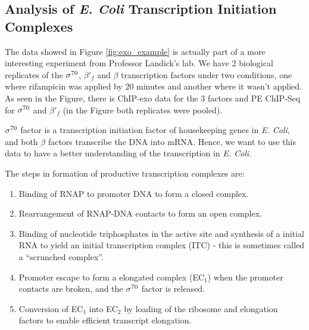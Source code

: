 \documentclass[11pt]{article}\usepackage[]{graphicx}\usepackage[]{color}
\begin{document}
\subsection{Analysis of \emph{E. Coli} Transcription Initiation Complexes}
\label{sec:ecoli}

The data showed in Figure \ref{fig:exo_example} is actually part of a
more interesting experiment from Professor Landick's lab. We have 2
biological replicates of the $\sigma^{70}$, $\beta'_f$ and $\beta$
transcription factors under two conditions, one where rifampicin was
applied by 20 minutes and another where it wasn't applied. As seen in
the Figure, there is ChIP-exo data for the 3 factors and PE ChIP-Seq
for $\sigma^{70}$ and $\beta'_f$ (in the Figure both replicates were pooled).

$\sigma^{70}$ factor is a transcription initiation factor of housekeeping
genes in \emph{E. Coli}, and both $\beta$ factors transcribe the DNA into
mRNA. Hence, we want to use this data to have a better understanding
of the transcription in \emph{E. Coli}.

The steps in formation of productive transcription complexes are:

\begin{enumerate}
\item Binding of RNAP to promoter DNA to form a closed complex.
\item Rearrangement of RNAP-DNA contacts to form an open complex.
\item Binding of nucleotide triphosphates in the active site and
  synthesis of a initial RNA to yield an initial transcription complex
  (ITC) - this is sometimes called a ``scrunched complex''.
\item Promoter escape to form a elongated complex (EC$_1$) when the
  promoter contacts are broken, and the $\sigma^{70}$ factor is released.
\item Conversion of EC$_1$ into EC$_2$ by loading of the ribosome and
  elongation factors to enable efficient transcript elongation.
\end{enumerate}

\end{document}

